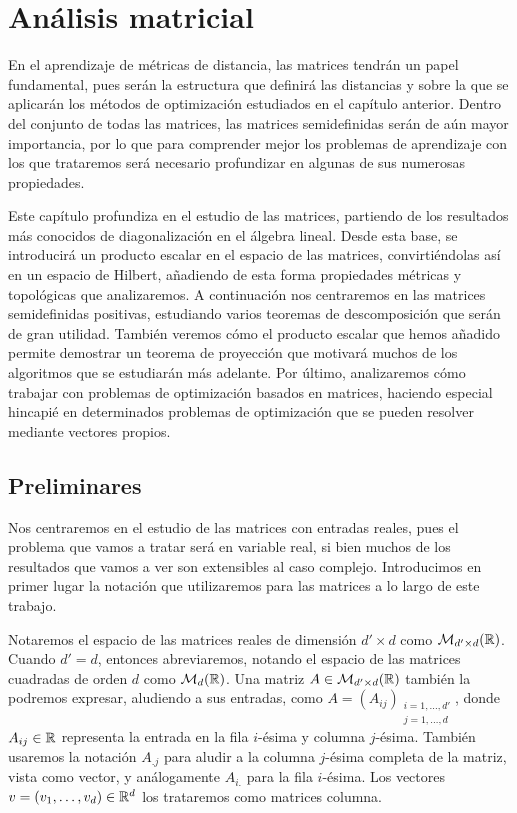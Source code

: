 \chapter{Análisis matricial} \label{chapter:matrices}

En el aprendizaje de métricas de distancia, las matrices tendrán un papel fundamental, pues serán la estructura que definirá las distancias y sobre la que se aplicarán los métodos de optimización estudiados en el capítulo anterior. Dentro del conjunto de todas las matrices, las matrices semidefinidas serán de aún mayor importancia, por lo que para comprender mejor los problemas de aprendizaje con los que trataremos será necesario profundizar en algunas de sus numerosas propiedades.

Este capítulo profundiza en el estudio de las matrices, partiendo de los resultados más conocidos de diagonalización en el álgebra lineal. Desde esta base, se introducirá un producto escalar en el espacio de las matrices, convirtiéndolas así en un espacio de Hilbert, añadiendo de esta forma propiedades métricas y topológicas que analizaremos. A continuación nos centraremos en las matrices semidefinidas positivas, estudiando varios teoremas de descomposición que serán de gran utilidad. También veremos cómo el producto escalar que hemos añadido permite demostrar un teorema de proyección que motivará muchos de los algoritmos que se estudiarán más adelante. Por último, analizaremos cómo trabajar con problemas de optimización basados en matrices, haciendo especial hincapié en determinados problemas de optimización que se pueden resolver mediante vectores propios.

\section{Preliminares}

Nos centraremos en el estudio de las matrices con entradas reales, pues el problema que vamos a tratar será en variable real, si bien muchos de los resultados que vamos a ver son extensibles al caso complejo. Introducimos en primer lugar la notación que utilizaremos para las matrices a lo largo de este trabajo.

Notaremos el espacio de las matrices reales de dimensión $d' \times d$ como $\mathcal{M}_{d'\times d}(\mathbb{R})$. Cuando $d' = d$, entonces abreviaremos, notando el espacio de las matrices cuadradas de orden $d$ como $\mathcal{M}_d(\mathbb{R})$. Una matriz $A \in \mathcal{M}_{d'\times d}(\mathbb{R})$ también la podremos expresar, aludiendo a sus entradas, como $A = (A_{ij})_{\substack{i=1,\dots,d' \\ j=1,\dots,d}}$, donde $A_{ij} \in \mathbb{R}$ representa la entrada en la fila $i$-ésima y columna $j$-ésima. También usaremos la notación $A_{.j}$ para aludir a la columna $j$-ésima completa de la matriz, vista como vector, y análogamente $A_{i.}$ para la fila $i$-ésima. Los vectores $v = (v_1,\dots,v_d) \in \mathbb{R}^d$ los trataremos como matrices columna.

